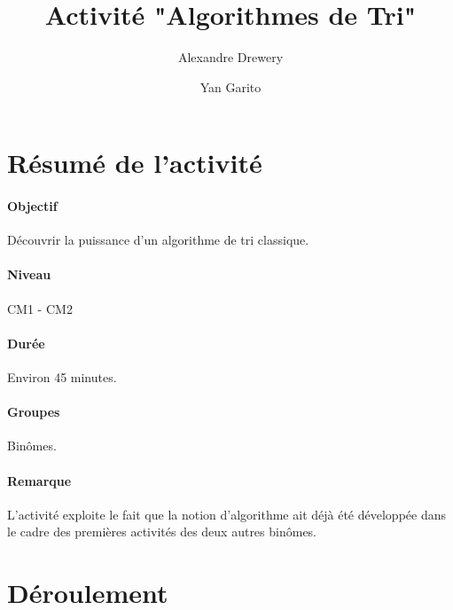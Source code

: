 \documentclass[a4paper,11pt]{article}%
\title{Activité "Algorithmes de Tri"}%
\author{Alexandre Drewery \and Yan Garito}%
\date{}%
\begin{document}
%

\maketitle%

\section{Résumé de l'activité}

\paragraph{Objectif}
Découvrir la puissance d'un algorithme de tri classique.

\paragraph{Niveau}
CM1 - CM2

\paragraph{Durée}
Environ 45 minutes.

\paragraph{Groupes}
Binômes.

\paragraph{Remarque}
L'activité exploite le fait que la notion d'algorithme ait déjà été développée dans le cadre des premières activités des deux autres binômes.

\section{Déroulement}
\end{document}
